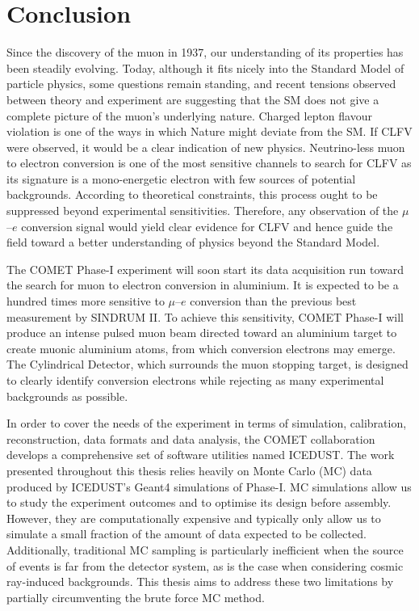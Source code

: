\chapter{Conclusion}

Since the discovery of the muon in 1937, our understanding of its properties has
been steadily evolving. Today, although it fits nicely into the Standard Model
of particle physics, some questions remain standing, and recent tensions
observed between theory and experiment are suggesting that the SM does not give
a complete picture of the muon's underlying nature. Charged lepton flavour
violation is one of the ways in which Nature might deviate from the SM. If CLFV
were observed, it would be a clear indication of new physics. Neutrino-less muon
to electron conversion is one of the most sensitive channels to search for CLFV
as its signature is a mono-energetic electron with few sources of potential
backgrounds. According to theoretical constraints, this process ought to be
suppressed beyond experimental sensitivities. Therefore, any observation of the
$\mu$--$e$ conversion signal would yield clear evidence for CLFV and hence guide
the field toward a better understanding of physics beyond the Standard Model.

The COMET Phase-I experiment will soon start its data acquisition run toward the
search for muon to electron conversion in aluminium. It is expected to be a
hundred times more sensitive to $\mu$--$e$ conversion than the previous best
measurement by SINDRUM II. To achieve this sensitivity, COMET Phase-I will
produce an intense pulsed muon beam directed toward an aluminium target to
create muonic aluminium atoms, from which conversion electrons may emerge. The
Cylindrical Detector, which surrounds the muon stopping target, is designed to
clearly identify conversion electrons while rejecting as many experimental
backgrounds as possible. 

In order to cover the needs of the experiment in terms of simulation,
calibration, reconstruction, data formats and data analysis, the COMET
collaboration develops a comprehensive set of software utilities named ICEDUST.
The work presented throughout this thesis relies heavily on Monte Carlo (MC) data
produced by ICEDUST's {\sc Geant4} simulations of Phase-I.
MC simulations allow us to study the experiment outcomes and to optimise its
design before assembly. However, they are computationally expensive and
typically only allow us to simulate a small fraction of the amount of data
expected to be collected. Additionally, traditional MC sampling is particularly
inefficient when the source of events is far from the detector system, as is the
case when considering cosmic ray-induced backgrounds. This thesis aims to
address these two limitations by partially circumventing the brute force MC
method.

